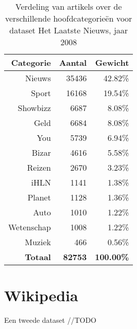 \begin{table}[htbp]
	\centering
	\caption{Verdeling van artikels over de verschillende hoofdcategorie\"en voor dataset Het Laatste Nieuws, jaar 2008}
	\begin{tabular}{rrr}
		\toprule
		Categorie & Aantal & Gewicht \\
		\midrule
		Nieuws & 35436 & 42.82\% \\
		Sport & 16168 & 19.54\% \\
		Showbizz & 6687  & 8.08\% \\
		Geld  & 6684  & 8.08\% \\
		You   & 5739  & 6.94\% \\
		Bizar & 4616  & 5.58\% \\
		Reizen & 2670  & 3.23\% \\
		iHLN  & 1141  & 1.38\% \\
		Planet & 1128  & 1.36\% \\
		Auto  & 1010  & 1.22\% \\
		Wetenschap & 1008  & 1.22\% \\
		Muziek & 466   & 0.56\% \\
		\textbf{Totaal} & \textbf{82753} & \textbf{100.00\%} \\
		\bottomrule
	\end{tabular}%
	\label{tab:hln-2008-cat}%
\end{table}%

\section{Wikipedia}
Een tweede dataset
//TODO